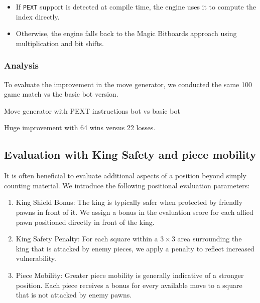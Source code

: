 \begin{itemize}
  \item If \texttt{PEXT} support is detected at compile time, the engine uses it to compute the index directly.
  \item Otherwise, the engine falls back to the Magic Bitboards approach using multiplication and bit shifts.
\end{itemize}

\subsubsection{Analysis}

To evaluate the improvement in the move generator, we conducted the same 
100 game match vs the basic bot version.

\begin{center}
Move generator with PEXT instructions bot vs basic bot\\
\medskip
\end{center}

\noindent Huge improvement with 64 wins versus 22 losses.

\subsection{Evaluation with King Safety and piece mobility}

It is often beneficial to evaluate additional aspects of a position beyond simply counting material. We introduce the following positional evaluation parameters:

\begin{enumerate}
    \item King Shield Bonus: The king is typically safer when protected by friendly pawns in front of it. We assign a bonus in the evaluation score for each allied pawn positioned directly in front of the king.

    \item King Safety Penalty: For each square within a $3 \times 3$ area surrounding the king that is attacked by enemy pieces, we apply a penalty to reflect increased vulnerability.

    \item Piece Mobility: Greater piece mobility is generally indicative of a stronger position. Each piece receives a bonus for every available move to a square that is not attacked by enemy pawns.
\end{enumerate}

